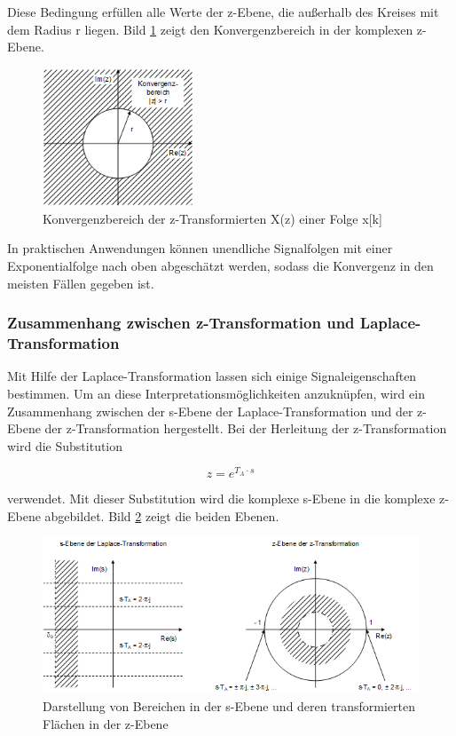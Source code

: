 \noindent Diese Bedingung erf\"{u}llen alle Werte der z-Ebene, die au{\ss}erhalb des Kreises mit dem Radius r liegen. Bild \ref{fig:KonvergenzbereichZEbene} zeigt den Konvergenzbereich in der komplexen z-Ebene.
\clearpage
\begin{figure}[H]
  \centerline{\includegraphics[width=0.4\textwidth]{Kapitel5/Bilder/image1.png}}
  \caption{Konvergenzbereich der z-Transformierten X(z) einer Folge x[k]}
  \label{fig:KonvergenzbereichZEbene}
\end{figure}

\noindent In praktischen Anwendungen k\"{o}nnen unendliche Signalfolgen mit einer Exponentialfolge nach oben abgesch\"{a}tzt werden, sodass die Konvergenz in den meisten F\"{a}llen gegeben ist. 

\subsubsection{Zusammenhang zwischen z-Transformation und Laplace-Transformation}

\noindent Mit Hilfe der Laplace-Transformation lassen sich einige Signaleigenschaften bestimmen. Um an diese Interpretationsm\"{o}glichkeiten anzukn\"{u}pfen, wird ein Zusammenhang zwischen der s-Ebene der Laplace-Transformation und der z-Ebene der z-Transformation hergestellt. Bei der Herleitung der z-Transformation wird die Substitution 

\begin{equation}\label{eq:fivethirty}
z=e^{T_{A} \cdot s} 
\end{equation}

\noindent verwendet. Mit dieser Substitution wird die komplexe s-Ebene in die komplexe z-Ebene abgebildet. Bild \ref{fig:VergleichSUndZEbene} zeigt die beiden Ebenen.

\begin{figure}[H]
  \centerline{\includegraphics[width=1\textwidth]{Kapitel5/Bilder/image2.png}}
  \caption{Darstellung von Bereichen in der s-Ebene und deren transformierten Fl\"{a}chen in der z-Ebene}
  \label{fig:VergleichSUndZEbene}
\end{figure}

